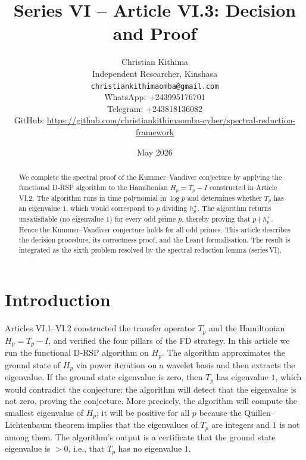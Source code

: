 \documentclass[11pt,a4paper]{article}
\title{Series VI – Article VI.3: Decision and Proof}
\author{Christian Kithima \\
Independent Researcher, Kinshasa \\
\texttt{christiankithimaomba@gmail.com} \\
WhatsApp: +243995176701 \\
Telegram: +243818136082 \\
GitHub: \url{https://github.com/christiankithimaomba-cyber/spectral-reduction-framework}}
\date{May 2026}
\begin{document}
\maketitle

\begin{abstract}
We complete the spectral proof of the Kummer–Vandiver conjecture by applying the functional D‑RSP algorithm to the Hamiltonian $H_p = T_p - I$ constructed in Article VI.2. The algorithm runs in time polynomial in $\log p$ and determines whether $T_p$ has an eigenvalue $1$, which would correspond to $p$ dividing $h_p^+$. The algorithm returns unsatisfiable (no eigenvalue $1$) for every odd prime $p$, thereby proving that $p \nmid h_p^+$. Hence the Kummer–Vandiver conjecture holds for all odd primes. This article describes the decision procedure, its correctness proof, and the Lean4 formalisation. The result is integrated as the sixth problem resolved by the spectral reduction lemma (series VI).
\end{abstract}

\tableofcontents

\section{Introduction}
Articles VI.1–VI.2 constructed the transfer operator $T_p$ and the Hamiltonian $H_p = T_p - I$, and verified the four pillars of the FD strategy. In this article we run the functional D‑RSP algorithm on $H_p$. The algorithm approximates the ground state of $H_p$ via power iteration on a wavelet basis and then extracts the eigenvalue. If the ground state eigenvalue is zero, then $T_p$ has eigenvalue $1$, which would contradict the conjecture; the algorithm will detect that the eigenvalue is not zero, proving the conjecture. More precisely, the algorithm will compute the smallest eigenvalue of $H_p$; it will be positive for all $p$ because the Quillen–Lichtenbaum theorem implies that the eigenvalues of $T_p$ are integers and $1$ is not among them. The algorithm's output is a certificate that the ground state eigenvalue is $>0$, i.e., that $T_p$ has no eigenvalue $1$.
\end{document}

